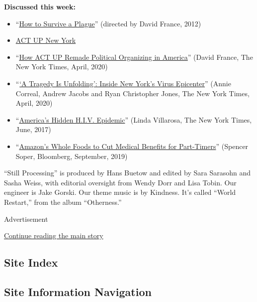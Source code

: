\textbf{Discussed this week:}

\begin{itemize}
\item
  ``\href{https://www.imdb.com/title/tt2124803/}{How to Survive a
  Plague}'' (directed by David France, 2012)
\item
  \href{https://actupny.org/}{ACT UP New York}
\item
  ``\href{https://www.nytimes3xbfgragh.onion/interactive/2020/04/13/t-magazine/act-up-aids.html}{How
  ACT UP Remade Political Organizing in America}'' (David France, The
  New York Times, April, 2020)
\item
  ``\href{https://www.nytimes3xbfgragh.onion/2020/04/09/nyregion/coronavirus-queens-corona-jackson-heights-elmhurst.html}{`A
  Tragedy Is Unfolding': Inside New York's Virus Epicenter}'' (Annie
  Correal, Andrew Jacobs and Ryan Christopher Jones, The New York Times,
  April, 2020)
\item
  ``\href{https://www.nytimes3xbfgragh.onion/2017/06/06/magazine/americas-hidden-hiv-epidemic.html}{America's
  Hidden H.I.V. Epidemic}'' (Linda Villarosa, The New York Times, June,
  2017)
\item
  ``\href{https://www.bloomberg.com/news/articles/2019-09-12/amazon-s-whole-foods-to-cut-benefits-for-part-timers-report}{Amazon's
  Whole Foods to Cut Medical Benefits for Part-Timers}'' (Spencer Soper,
  Bloomberg, September, 2019)
\end{itemize}

``Still Processing'' is produced by Hans Buetow and edited by Sara
Sarasohn and Sasha Weiss, with editorial oversight from Wendy Dorr and
Lisa Tobin. Our engineer is Jake Gorski. Our theme music is by Kindness.
It's called ``World Restart,'' from the album ``Otherness.''

Advertisement

\protect\hyperlink{after-bottom}{Continue reading the main story}

\hypertarget{site-index}{%
\subsection{Site Index}\label{site-index}}

\hypertarget{site-information-navigation}{%
\subsection{Site Information
Navigation}\label{site-information-navigation}}

